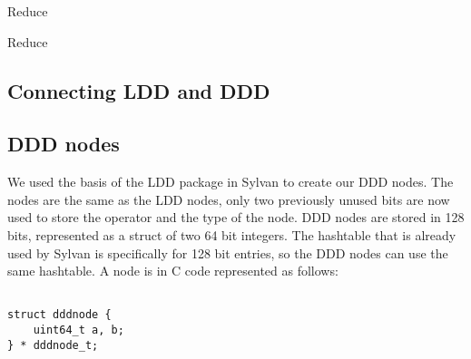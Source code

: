 \begin{algorithm}
\caption{Reduce}\label{alg:Reduce}
\begin{algorithmic}[1]
					\EndIf
				\EndIf
			\EndFor
		\EndFor
	\EndFor				
\EndProcedure
\end{algorithmic}
\end{algorithm}

\begin{algorithm}
\caption{Reduce}\label{alg:ReduceZero}
\begin{algorithmic}[1]
				\EndIf
			\EndFor
		\EndIf
	\EndFor
				\Break
			\EndIf
		\EndFor
	\EndFor
		\EndFor
	\EndFor
					\EndIf
				\EndFor
			\EndIf
		\EndFor
		\EndFor
	\EndFor
		
\EndProcedure
\end{algorithmic}
\end{algorithm}

\subsection{Connecting LDD and DDD}


\subsection{DDD nodes}
We used the basis of the LDD package in Sylvan to create our DDD nodes. The nodes are the same as the LDD nodes, only two previously unused bits are now used to store the operator and the type of the node. DDD nodes are stored in 128 bits, represented as a struct of two 64 bit integers. The hashtable that is already used by Sylvan is specifically for 128 bit entries, so the DDD nodes can use the same hashtable. A node is in C code represented as follows:
\begin{lstlisting} 

struct dddnode {
    uint64_t a, b;
} * dddnode_t; 
\end{lstlisting}

